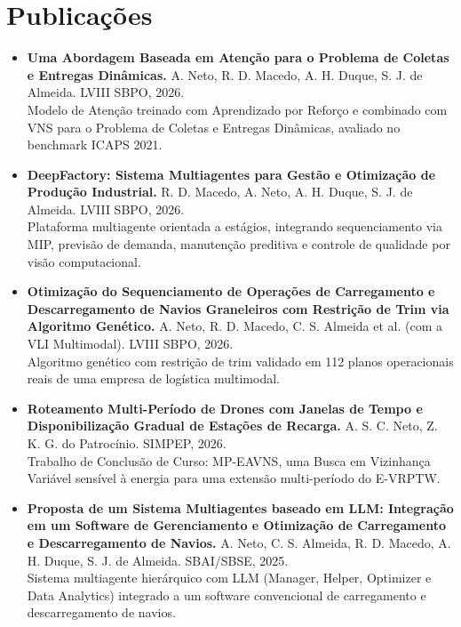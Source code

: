 \documentclass[a4paper,10pt]{article}
\begin{document}
\section*{ Publicações}
\begin{itemize}[label=]
    \item \textbf{Uma Abordagem Baseada em Atenção para o Problema de Coletas e Entregas Dinâmicas.} A. Neto, R. D. Macedo, A. H. Duque, S. J. de Almeida. LVIII SBPO, 2026. \\
    Modelo de Atenção treinado com Aprendizado por Reforço e combinado com VNS para o Problema de Coletas e Entregas Dinâmicas, avaliado no benchmark ICAPS 2021.
    \item \textbf{DeepFactory: Sistema Multiagentes para Gestão e Otimização de Produção Industrial.} R. D. Macedo, A. Neto, A. H. Duque, S. J. de Almeida. LVIII SBPO, 2026. \\
    Plataforma multiagente orientada a estágios, integrando sequenciamento via MIP, previsão de demanda, manutenção preditiva e controle de qualidade por visão computacional.
    \item \textbf{Otimização do Sequenciamento de Operações de Carregamento e Descarregamento de Navios Graneleiros com Restrição de Trim via Algoritmo Genético.} A. Neto, R. D. Macedo, C. S. Almeida et al. (com a VLI Multimodal). LVIII SBPO, 2026. \\
    Algoritmo genético com restrição de trim validado em 112 planos operacionais reais de uma empresa de logística multimodal.
    \item \textbf{Roteamento Multi-Período de Drones com Janelas de Tempo e Disponibilização Gradual de Estações de Recarga.} A. S. C. Neto, Z. K. G. do Patrocínio. SIMPEP, 2026. \\
    Trabalho de Conclusão de Curso: MP-EAVNS, uma Busca em Vizinhança Variável sensível à energia para uma extensão multi-período do E-VRPTW.
    \item \textbf{Proposta de um Sistema Multiagentes baseado em LLM: Integração em um Software de Gerenciamento e Otimização de Carregamento e Descarregamento de Navios.} A. Neto, C. S. Almeida, R. D. Macedo, A. H. Duque, S. J. de Almeida. SBAI/SBSE, 2025. \\
    Sistema multiagente hierárquico com LLM (Manager, Helper, Optimizer e Data Analytics) integrado a um software convencional de carregamento e descarregamento de navios.
\end{itemize}
\end{document}

